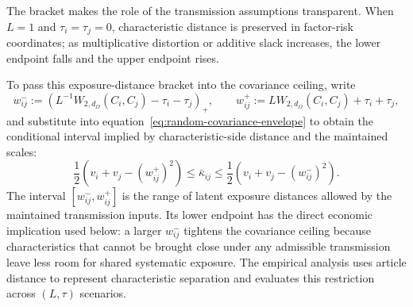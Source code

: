 The bracket makes the role of the transmission assumptions transparent.
When $L=1$ and $\tau_i=\tau_j=0$, characteristic distance is preserved in
factor-risk coordinates; as multiplicative distortion or additive slack
increases, the lower endpoint falls and the upper endpoint rises.

To pass this exposure-distance bracket into the covariance ceiling, write
\begin{equation}\label{eq:random-w2-bracket}
  w^-_{ij}:=\left(L^{-1}W_{2,d_\Omega}(C_i,C_j)-\tau_i-\tau_j\right)_+,
  \qquad
  w^+_{ij}:=LW_{2,d_\Omega}(C_i,C_j)+\tau_i+\tau_j,
\end{equation}
and substitute  into
equation~\ref{eq:random-covariance-envelope} to obtain the conditional
interval implied by characteristic-side distance and the maintained scales:
\begin{equation}\label{eq:random-kappa-bracket}
  \frac12\left(v_i+v_j-(w^+_{ij})^2\right)
  \le \bar\kappa_{ij}
  \le \frac12\left(v_i+v_j-(w^-_{ij})^2\right).
\end{equation}
The interval $[w^-_{ij},w^+_{ij}]$ is the range of latent exposure distances
allowed by the maintained transmission inputs.
Its lower endpoint has the direct economic implication used below: a larger
$w^-_{ij}$ tightens the covariance ceiling because characteristics that
cannot be brought close under any admissible transmission leave less room for
shared systematic exposure.
The empirical analysis uses article distance to represent characteristic
separation and evaluates this restriction across $(L,\tau)$ scenarios.
